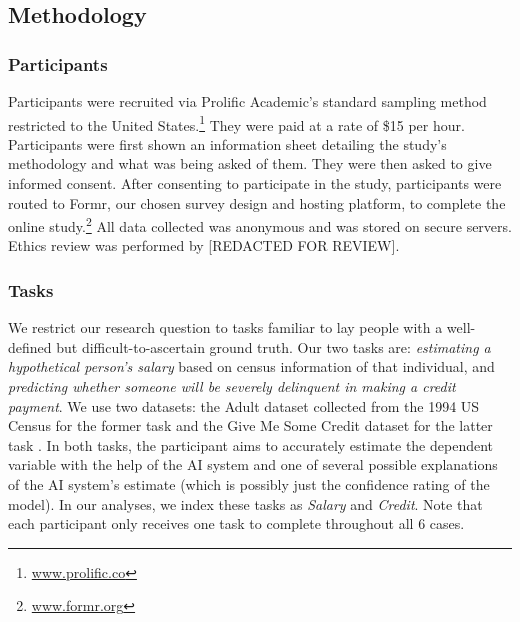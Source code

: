\subsection{Methodology}
\subsubsection{Participants}
Participants were recruited via Prolific Academic's standard sampling method restricted to the United States.\footnote{\url{www.prolific.co}} They were paid at a rate of \$15 per hour. Participants were first shown an information sheet detailing the study's methodology and what was being asked of them. They were then asked to give informed consent. After consenting to participate in the study, participants were routed to Formr, our chosen survey design and hosting platform, to complete the online study.\footnote{\url{www.formr.org}} All data collected was anonymous and was stored on secure servers. Ethics review was performed by [REDACTED FOR REVIEW].

\subsubsection{Tasks}
We restrict our research question to tasks familiar to lay people with a well-defined but difficult-to-ascertain ground truth. Our two tasks are: \emph{estimating a hypothetical person's salary} based on census information of that individual, and \emph{predicting whether someone will be severely delinquent in making a credit payment}. We use two datasets: the Adult dataset collected from the 1994 US Census for the former task and the Give Me Some Credit dataset for the latter task \cite{Kohavi, GiveMeSomeCredit}. In both tasks, the participant aims to accurately estimate the dependent variable with the help of the AI system and one of several possible explanations of the AI system's estimate (which is possibly just the confidence rating of the model). In our analyses, we index these tasks as \emph{Salary} and \emph{Credit}. Note that each participant only receives one task to complete throughout all 6 cases. 

